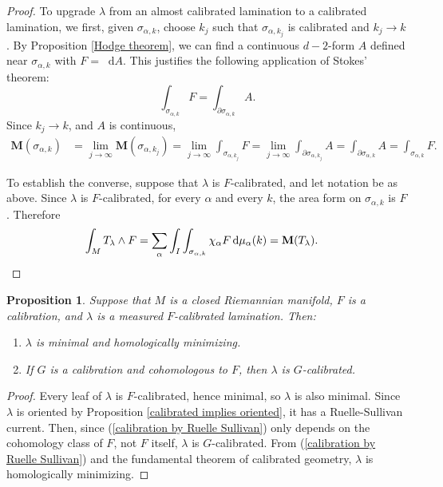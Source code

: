 \documentclass[reqno,11pt]{amsart}
\newcommand*\dif{\mathop{}\!\mathrm{d}}
\newcommand{\Mass}{\mathbf M}
\newtheorem{proposition}[theorem]{Proposition}
\theoremstyle{definition}
\numberwithin{equation}{section}
\begin{document}
\begin{proof}
To upgrade $\lambda$ from an almost calibrated lamination to a calibrated lamination, we first, given $\sigma_{\alpha, k}$, choose $k_j$ such that $\sigma_{\alpha, k_j}$ is calibrated and $k_j \to k$.
By Proposition \ref{Hodge theorem}, we can find a continuous $d - 2$-form $A$ defined near $\sigma_{\alpha, k}$ with $F = \dif A$.
This justifies the following application of Stokes' theorem: 
$$\int_{\sigma_{\alpha, k}} F = \int_{\partial \sigma_{\alpha, k}} A.$$
Since $k_j \to k$, and $A$ is continuous,
\begin{align*}
\Mass(\sigma_{\alpha, k}) &= \lim_{j \to \infty} \Mass(\sigma_{\alpha, k_j}) = \lim_{j \to \infty} \int_{\sigma_{\alpha, k_j}} F = \lim_{j \to \infty} \int_{\partial \sigma_{\alpha, k_j}} A = \int_{\partial \sigma_{\alpha, k}} A = \int_{\sigma_{\alpha, k}} F.
\end{align*}

To establish the converse, suppose that $\lambda$ is $F$-calibrated, and let notation be as above.
Since $\lambda$ is $F$-calibrated, for every $\alpha$ and every $k$, the area form on $\sigma_{\alpha, k}$ is $F$. Therefore
\begin{align*}
\int_M T_\lambda \wedge F &= \sum_\alpha \int_I \int_{\sigma_{\alpha, k}} \chi_\alpha F \dif \mu_\alpha(k) = \Mass(T_\lambda). \qedhere
\end{align*}
\end{proof}

\begin{proposition}\label{properties of calibrated laminations}
Suppose that $M$ is a closed Riemannian manifold, $F$ is a calibration, and $\lambda$ is a measured $F$-calibrated lamination.
Then:
\begin{enumerate}
\item $\lambda$ is minimal and homologically minimizing.
\item If $G$ is a calibration and cohomologous to $F$, then $\lambda$ is $G$-calibrated.
\end{enumerate}
\end{proposition}
\begin{proof}
Every leaf of $\lambda$ is $F$-calibrated, hence minimal, so $\lambda$ is also minimal.
Since $\lambda$ is oriented by Proposition \ref{calibrated implies oriented}, it has a Ruelle-Sullivan current.
Then, since (\ref{calibration by Ruelle Sullivan}) only depends on the cohomology class of $F$, not $F$ itself, $\lambda$ is $G$-calibrated.
From (\ref{calibration by Ruelle Sullivan}) and the fundamental theorem of calibrated geometry, $\lambda$ is homologically minimizing.
\end{proof}
\end{document}
